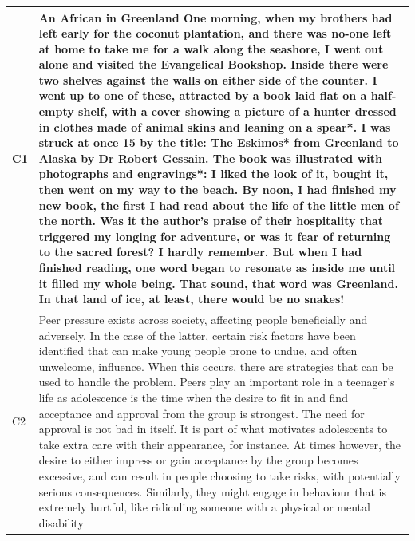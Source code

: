 \documentclass[11pt,a4paper]{article}
\begin{document}
\begin{longtable}{l|p{}}
  \midrule
  C1 & An African in Greenland \newline
  One morning, when my brothers had left early for the coconut plantation, and
  there was no-one left at home to take me for a walk along the seashore, I went
  out alone and visited the Evangelical Bookshop. Inside there were two shelves
  against the walls on either side of the counter. I went up to one of these,
  attracted by a book laid flat on a half-empty shelf, with a cover showing a
  picture of a hunter dressed in clothes made of animal skins and leaning on a
  spear*. I was struck at once 15 by the title: The Eskimos* from Greenland to
  Alaska by Dr Robert Gessain. The book was illustrated with photographs and
  engravings*: I liked the look of it, bought it, then went on my way to the
  beach. By noon, I had finished my new book, the first I had read about the life
  of the little men of the north. Was it the author's praise of their hospitality
  that triggered my longing for adventure, or was it fear of returning to the
  sacred forest? I hardly remember. But when I had finished reading, one word
  began to resonate as inside me until it filled my whole being. That sound, that
  word was Greenland. In that land of ice, at least, there would be no snakes!\\
  \midrule
  C2 & Peer pressure exists across society, affecting people beneficially and adversely.
  In the case of the latter, certain risk factors have been identified that can make
  young people prone to undue, and often unwelcome, influence. When this occurs,
  there are strategies that can be used to handle the problem.
  Peers play an important role in a teenager's life as adolescence is the time
  when the desire to fit in and find acceptance and approval from the group is
  strongest. The need for approval is not bad in itself. It is part of what
  motivates adolescents to take extra care with their appearance, for instance.
  At times however, the desire to either impress or gain acceptance by the group
  becomes excessive, and can result in people choosing to take risks, with
  potentially serious consequences. Similarly, they might engage in behaviour
  that is extremely hurtful, like ridiculing someone with a physical or mental
  disability\\
  \bottomrule
\end{longtable}
\end{document}
